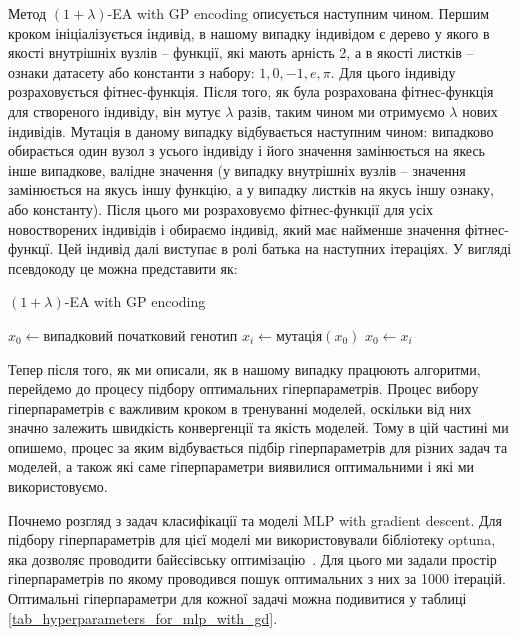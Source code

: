 \vspace{1cm}

Метод $(1+\lambda)$-EA with GP encoding описується наступним чином. Першим кроком ініціалізується індивід, в нашому випадку індивідом є дерево у якого в якості внутрішніх вузлів -- функції, які мають арність 2, а в якості листків -- ознаки датасету або константи з набору: $1, 0, -1, e, \pi$. Для цього індивіду розраховується фітнес-функція. Після того, як була розрахована фітнес-функція для створеного індивіду, він мутує $\lambda$ разів, таким чином ми отримуємо $\lambda$ нових індивідів. Мутація в даному випадку відбувається наступним чином: випадково обирається один вузол з усього індивіду і його значення замінюється на якесь інше випадкове, валідне значення (у випадку внутрішніх вузлів -- значення замінюється на якусь іншу функцію, а у випадку листків на якусь іншу ознаку, або константу).  Після цього ми розраховуємо фітнес-функції для усіх новостворених індивідів і обираємо індивід, який має найменше значення фітнес-функцї. Цей індивід далі виступає в ролі батька на наступних ітераціях. У вигляді псевдокоду це можна представити як:

\begin{algorithm}
	\caption{$(1+\lambda)$-EA with GP encoding}
	\begin{algorithmic}[1]
		\STATE $x_0 \gets \text{випадковий початковий генотип}$
		\STATE $x_i \gets \text{мутація}(x_0)$
		\ENDFOR
		\STATE $x_0 \gets x_i$
		\ENDIF
		\ENDFOR
		\ENDWHILE
	\end{algorithmic}
\end{algorithm}

Тепер після того, як ми описали, як в нашому випадку працюють алгоритми, перейдемо до процесу підбору оптимальних гіперпараметрів. Процес вибору гіперпараметрів є важливим кроком в тренуванні моделей, оскільки від них значно залежить швидкість конвергенції та якість моделей. Тому в цій частині ми опишемо, процес за яким відбувається підбір гіперпараметрів для різних задач та моделей, а також які саме гіперпараметри виявилися оптимальними і які ми використовуємо.

Почнемо розгляд з задач класифікації та моделі MLP with gradient descent. Для підбору гіперпараметрів для цієї моделі ми використовували бібліотеку optuna, яка дозволяє проводити байєсівську оптимізацію~\cite{ct37}. Для цього ми задали простір гіперпараметрів по якому проводився пошук оптимальних з них за 1000 ітерацій. Оптимальні гіперпараметри для кожної задачі можна подивитися у таблиці \ref{tab_hyperparameters_for_mlp_with_gd}.


